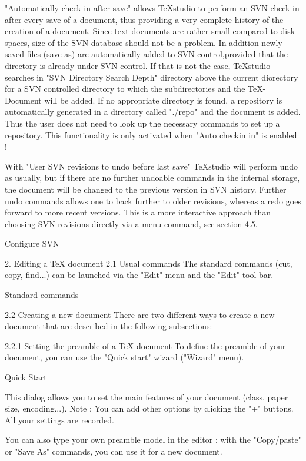 \documentclass{article}
\begin{document}
	"Automatically check in after save" allows TeXstudio to perform an SVN check in after every save of a document, thus providing a very complete history of the creation of a document. Since text documents are rather small compared to disk spaces, size of the SVN database should not be a problem. In addition newly saved files (save as) are automatically added to SVN control,provided that the directory is already under SVN control. If that is not the case, TeXstudio searches in "SVN Directory Search Depth" directory above the current diorectory for a SVN controlled directory to which the subdirectories and the TeX-Document will be added. If no appropriate directory is found, a repository is automatically generated in a directory called "./repo" and the document is added. Thus the user does not need to look up the necessary commands to set up a repository. This functionality is only activated when "Auto checkin in" is enabled !
	
	With "User SVN revisions to undo before last save" TeXstudio will perform undo as usually, but if there are no further undoable commands in the internal storage, the document will be changed to the previous version in SVN history. Further undo commands allows one to back further to older revisions, whereas a redo goes forward to more recent versions. This is a more interactive approach than choosing SVN revisions directly via a menu command, see section 4.5.
	
	Configure SVN
	
	2. Editing a TeX document
	2.1 Usual commands
	The standard commands (cut, copy, find...) can be launched via the "Edit" menu and the "Edit" tool bar.
	
	Standard commands
	
	2.2 Creating a new document
	There are two different ways to create a new document that are described in the following subsections:
	
	2.2.1 Setting the preamble of a TeX document
	To define the preamble of your document, you can use the "Quick start" wizard ("Wizard" menu).
	
	Quick Start
	
	This dialog allows you to set the main features of your document (class, paper size, encoding...).
	Note : You can add other options by clicking the "+" buttons. All your settings are recorded.
	
	You can also type your own preamble model in the editor : with the "Copy/paste" or "Save As" commands, you can use it for a new document.
	
\end{document}
